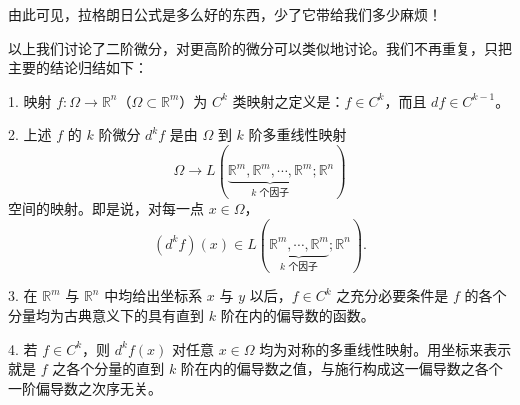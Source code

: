 由此可见，拉格朗日公式是多么好的东西，少了它带给我们多少麻烦！

以上我们讨论了二阶微分，对更高阶的微分可以类似地讨论。我们不再重复，只把主要的结论归结如下：

1. 映射 $f:\Omega\to\mathbb R^n$（$\Omega\subset\mathbb R^m$）为 $C^k$ 类映射之定义是：$f\in C^k$，而且 $df\in C^{k-1}$。

2. 上述 $f$ 的 $k$ 阶微分 $d^kf$ 是由 $\Omega$ 到 $k$ 阶多重线性映射
\[
 \Omega\to L(\underbrace{\mathbb R^m,\mathbb R^m,\cdots,\mathbb R^m}_{k\text{ 个因子}};\mathbb R^n)
\]
空间的映射。即是说，对每一点 $x\in\Omega$，
\[
 (d^kf)(x)\in L(\underbrace{\mathbb R^m,\cdots,\mathbb R^m}_{k\text{ 个因子}};\mathbb R^n).
\]

3. 在 $\mathbb R^m$ 与 $\mathbb R^n$ 中均给出坐标系 $x$ 与 $y$ 以后，$f\in C^k$ 之充分必要条件是 $f$ 的各个分量均为古典意义下的具有直到 $k$ 阶在内的偏导数的函数。

4. 若 $f\in C^k$，则 $d^kf(x)$ 对任意 $x\in\Omega$ 均为对称的多重线性映射。用坐标来表示就是 $f$ 之各个分量的直到 $k$ 阶在内的偏导数之值，与施行构成这一偏导数之各个一阶偏导数之次序无关。
